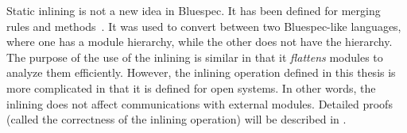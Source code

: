 Static inlining is not a new idea in Bluespec. It has been defined for
merging rules and methods~\cite{daniel-thesis}. It was used to convert
between two Bluespec-like languages, where one has a module hierarchy,
while the other does not have the hierarchy. The purpose of the use of
the inlining is similar in that it \emph{flattens} modules to analyze
them efficiently. However, the inlining operation defined in this
thesis is more complicated in that it is defined for open systems. In
other words, the inlining does not affect communications with external
modules. Detailed proofs (called the correctness of the inlining
operation) will be described in .



